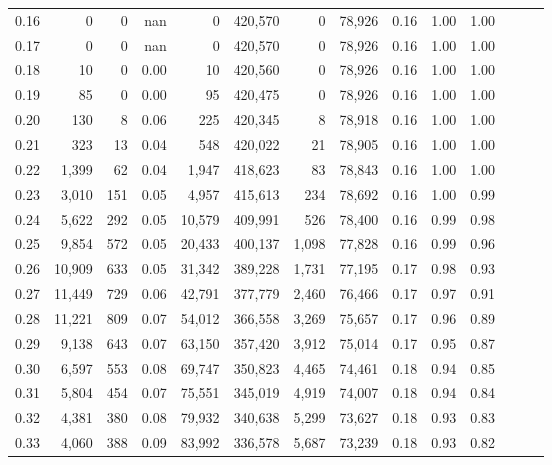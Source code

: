 \begin{tabular}{rrrrrrrrrrrrrr}
0.16 &       0 &      0 &   nan &        0 &  420,570 &       0 &  78,926 &  0.16 &  1.00 &      1.00 \\
0.17 &       0 &      0 &   nan &        0 &  420,570 &       0 &  78,926 &  0.16 &  1.00 &      1.00 \\
0.18 &      10 &      0 &  0.00 &       10 &  420,560 &       0 &  78,926 &  0.16 &  1.00 &      1.00 \\
0.19 &      85 &      0 &  0.00 &       95 &  420,475 &       0 &  78,926 &  0.16 &  1.00 &      1.00 \\
0.20 &     130 &      8 &  0.06 &      225 &  420,345 &       8 &  78,918 &  0.16 &  1.00 &      1.00 \\
0.21 &     323 &     13 &  0.04 &      548 &  420,022 &      21 &  78,905 &  0.16 &  1.00 &      1.00 \\
0.22 &   1,399 &     62 &  0.04 &    1,947 &  418,623 &      83 &  78,843 &  0.16 &  1.00 &      1.00 \\
0.23 &   3,010 &    151 &  0.05 &    4,957 &  415,613 &     234 &  78,692 &  0.16 &  1.00 &      0.99 \\
0.24 &   5,622 &    292 &  0.05 &   10,579 &  409,991 &     526 &  78,400 &  0.16 &  0.99 &      0.98 \\
0.25 &   9,854 &    572 &  0.05 &   20,433 &  400,137 &   1,098 &  77,828 &  0.16 &  0.99 &      0.96 \\
0.26 &  10,909 &    633 &  0.05 &   31,342 &  389,228 &   1,731 &  77,195 &  0.17 &  0.98 &      0.93 \\
0.27 &  11,449 &    729 &  0.06 &   42,791 &  377,779 &   2,460 &  76,466 &  0.17 &  0.97 &      0.91 \\
0.28 &  11,221 &    809 &  0.07 &   54,012 &  366,558 &   3,269 &  75,657 &  0.17 &  0.96 &      0.89 \\
0.29 &   9,138 &    643 &  0.07 &   63,150 &  357,420 &   3,912 &  75,014 &  0.17 &  0.95 &      0.87 \\
0.30 &   6,597 &    553 &  0.08 &   69,747 &  350,823 &   4,465 &  74,461 &  0.18 &  0.94 &      0.85 \\
0.31 &   5,804 &    454 &  0.07 &   75,551 &  345,019 &   4,919 &  74,007 &  0.18 &  0.94 &      0.84 \\
0.32 &   4,381 &    380 &  0.08 &   79,932 &  340,638 &   5,299 &  73,627 &  0.18 &  0.93 &      0.83 \\
0.33 &   4,060 &    388 &  0.09 &   83,992 &  336,578 &   5,687 &  73,239 &  0.18 &  0.93 &      0.82 \\

\end{tabular}
